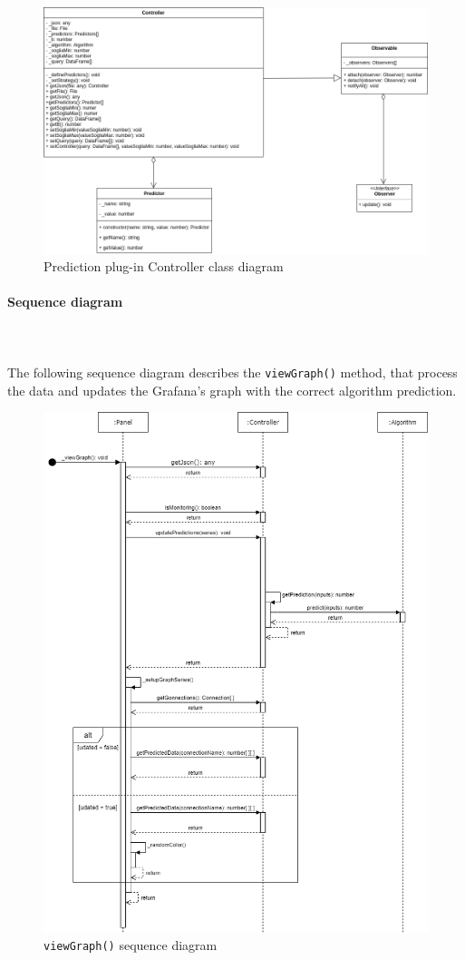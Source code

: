 \begin{figure}[H]
\centering
\includegraphics[scale=0.45]{../../../Diagrams/Classes_diagrams/plugin_controller.png}
\caption{Prediction plug-in Controller class diagram}
\end{figure}

\paragraph*{Sequence diagram}\mbox{} \\ \mbox{} \\
The following sequence diagram describes the \texttt{viewGraph()} method, that 
process the data and updates the Grafana's graph with the correct algorithm prediction.

\begin{center}
\begin{figure}[H]
\centering
\includegraphics[scale=0.55]{../../../Diagrams/Sequence_diagrams/viewGraph.png}
\caption{\texttt{viewGraph()} sequence diagram}
\end{figure}
\end{center}